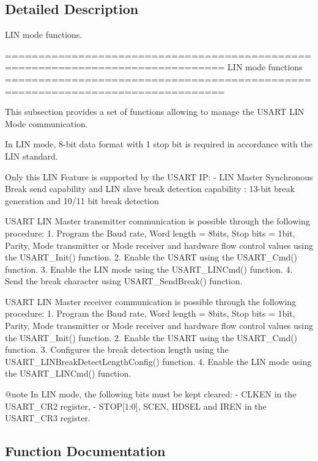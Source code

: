 \subsection{Detailed Description}
L\+IN mode functions. 

\begin{DoxyVerb} ===============================================================================
                                LIN mode functions
 ===============================================================================  

  This subsection provides a set of functions allowing to manage the USART LIN 
  Mode communication.
  
  In LIN mode, 8-bit data format with 1 stop bit is required in accordance with 
  the LIN standard.

  Only this LIN Feature is supported by the USART IP:
    - LIN Master Synchronous Break send capability and LIN slave break detection
      capability :  13-bit break generation and 10/11 bit break detection


  USART LIN Master transmitter communication is possible through the following procedure:
     1. Program the Baud rate, Word length = 8bits, Stop bits = 1bit, Parity, 
        Mode transmitter or Mode receiver and hardware flow control values using 
        the USART_Init() function.
     2. Enable the USART using the USART_Cmd() function.
     3. Enable the LIN mode using the USART_LINCmd() function.
     4. Send the break character using USART_SendBreak() function.

  USART LIN Master receiver communication is possible through the following procedure:
     1. Program the Baud rate, Word length = 8bits, Stop bits = 1bit, Parity, 
        Mode transmitter or Mode receiver and hardware flow control values using 
        the USART_Init() function.
     2. Enable the USART using the USART_Cmd() function.
     3. Configures the break detection length using the USART_LINBreakDetectLengthConfig()
        function.
     4. Enable the LIN mode using the USART_LINCmd() function.


@note In LIN mode, the following bits must be kept cleared:
        - CLKEN in the USART_CR2 register,
        - STOP[1:0], SCEN, HDSEL and IREN in the USART_CR3 register.\end{DoxyVerb}
 

\subsection{Function Documentation}
\mbox{\label{group___u_s_a_r_t___group4_ga7bc2d291831cbc5e53e73337308029b5}} 
